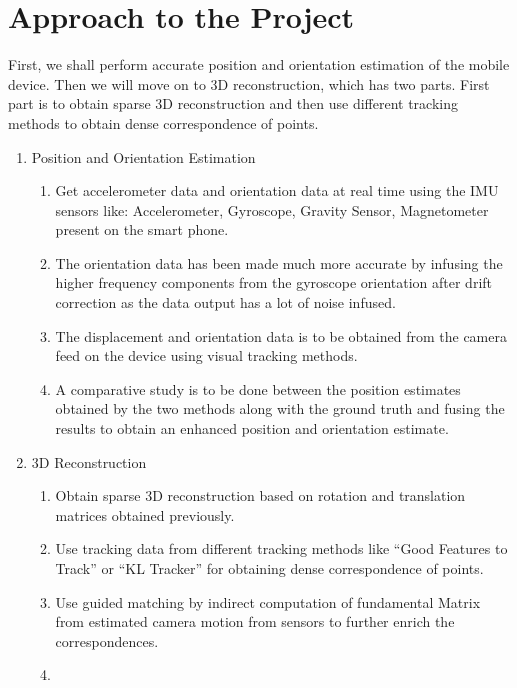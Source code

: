 \documentclass{article}
\begin{document}
	\section{Approach to the Project} First, we shall perform accurate position and orientation estimation of the mobile device. Then we will move on to 3D reconstruction, which has two parts. First part is to obtain sparse 3D reconstruction and then use different tracking methods to obtain dense correspondence of points.
		\begin{enumerate}
			\item Position and Orientation Estimation
			\begin{enumerate}
				\item
					Get accelerometer data and orientation data at real time using the IMU sensors like: Accelerometer, Gyroscope, Gravity Sensor, Magnetometer present on the smart phone.
				\item
					The orientation data has been made much more accurate by infusing the higher frequency components from the gyroscope orientation after drift correction as the data output has a lot of noise infused.
				\item
					The displacement and orientation data is to be obtained from the camera feed on the device using visual tracking methods.
				\item
					A comparative study is to be done between the position estimates obtained by the two methods along with the ground truth and fusing the results to obtain an enhanced position and orientation estimate.
			\end{enumerate}
			\item 3D Reconstruction
			\begin{enumerate}
				\item 
					Obtain sparse 3D reconstruction based on rotation and translation matrices obtained previously.
				\item
					Use tracking data from different tracking methods like ``Good Features to Track'' or ``KL Tracker'' for obtaining dense correspondence of points.
				\item
					Use guided matching by indirect computation of fundamental Matrix from estimated camera motion from sensors to further enrich the correspondences.
				\item

\end{enumerate}
\end{enumerate}
\end{document}
